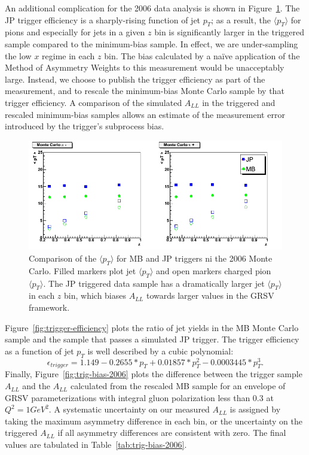An additional complication for the 2006 data analysis is shown in
Figure~\ref{fig:mean-pt-simu}. The JP trigger efficiency is a sharply-rising
function of jet \(p_T\); as a result, the \(\langle p_T \rangle\) for pions and
especially for jets in a given \(z\) bin is significantly larger in the
triggered sample compared to the minimum-bias sample. In effect, we are
under-sampling the low \(x\) regime in each \(z\) bin. The bias calculated by a
na\"ive application of the Method of Asymmetry Weights to this measurement would
be unacceptably large. Instead, we choose to publish the trigger efficiency as
part of the measurement, and to rescale the minimum-bias Monte Carlo sample by
that trigger efficiency. A comparison of the simulated \(A_{LL}\) in the
triggered and rescaled minimum-bias samples allows an estimate of the
measurement error introduced by the trigger's subprocess bias.

\begin{figure}
  \includegraphics[width=1.0\textwidth]{figures/meanpt-by-trigger}
  \caption{Comparison of the $\langle p_T \rangle$ for MB and JP triggers ni the 2006 Monte Carlo.  Filled markers plot jet $\langle p_T \rangle$ and open markers charged pion $\langle p_T \rangle$. The JP triggered data sample has a dramatically larger jet $\langle p_T \rangle$ in each $z$ bin, which biases $A_{LL}$ towards larger values in the GRSV framework.}
  \label{fig:mean-pt-simu}
\end{figure}

Figure~\ref{fig:trigger-efficiency} plots the ratio of jet yields in the MB
Monte Carlo sample and the sample that passes a simulated JP trigger. The
trigger efficiency as a function of jet \(p_T\) is well described by a cubic
polynomial:
%
\begin{equation}
  \epsilon_{trigger} = 1.149 - 0.2655 * p_T   + 0.01857 * p_T^2 - 0.0003445 * p_T^3.
  \label{eqn:trigger-efficiency}
\end{equation}
%
Finally, Figure~\ref{fig:trig-bias-2006} plots the difference between the
trigger sample \(A_{LL}\) and the \(A_{LL}\) calculated from the rescaled MB
sample for an envelope of GRSV parameterizations with integral gluon
polarization less than 0.3 at \(Q^2 = 1 GeV^2\). A systematic uncertainty on our
measured \(A_{LL}\) is assigned by taking the maximum asymmetry difference in
each bin, or the uncertainty on the triggered \(A_{LL}\) if all asymmetry
differences are consistent with zero. The final values are tabulated in
Table~\ref{tab:trig-bias-2006}.

